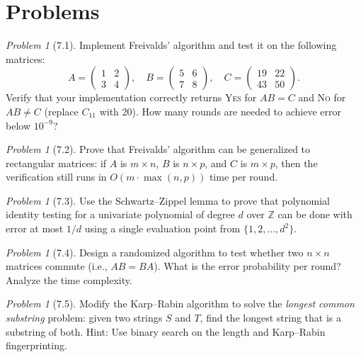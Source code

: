 \documentclass[twoside,12pt]{book}
\theoremstyle{plain}
\theoremstyle{definition}
\theoremstyle{remark}
\newtheorem{problem}[theorem]{Problem}
\begin{document}
\section*{Problems}

\begin{problem}[7.1]
Implement Freivalds' algorithm and test it on the following matrices:
\[
A = \begin{pmatrix} 1 & 2 \\ 3 & 4 \end{pmatrix}, \quad
B = \begin{pmatrix} 5 & 6 \\ 7 & 8 \end{pmatrix}, \quad
C = \begin{pmatrix} 19 & 22 \\ 43 & 50 \end{pmatrix}.
\]
Verify that your implementation correctly returns \textsc{Yes} for $AB = C$ and \textsc{No} for $AB \neq C$ (replace $C_{11}$ with 20). How many rounds are needed to achieve error below $10^{-9}$?
\end{problem}

\begin{problem}[7.2]
Prove that Freivalds' algorithm can be generalized to rectangular matrices: if $A$ is $m \times n$, $B$ is $n \times p$, and $C$ is $m \times p$, then the verification still runs in $O(m \cdot \max(n, p))$ time per round.
\end{problem}

\begin{problem}[7.3]
Use the Schwartz--Zippel lemma to prove that polynomial identity testing for a univariate polynomial of degree $d$ over $\mathbb{Z}$ can be done with error at most $1/d$ using a single evaluation point from $\{1, 2, \ldots, d^2\}$.
\end{problem}

\begin{problem}[7.4]
Design a randomized algorithm to test whether two $n \times n$ matrices commute (i.e., $AB = BA$). What is the error probability per round? Analyze the time complexity.
\end{problem}

\begin{problem}[7.5]
Modify the Karp--Rabin algorithm to solve the \emph{longest common substring} problem: given two strings $S$ and $T$, find the longest string that is a substring of both. Hint: Use binary search on the length and Karp--Rabin fingerprinting.
\end{problem}
\end{document}
